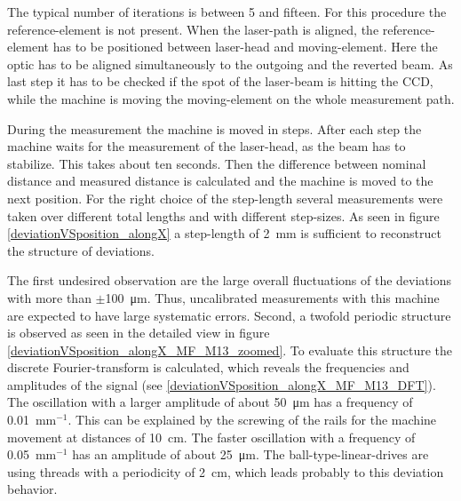 \documentclass[
twoside,            %
BCOR1.4cm,          %
10pt,               %
headings=normal,    %
headsepline,        %
clearplainpage,		%
final,              %
div=14,
open=right,
bibliography=toc
]{scrreprt}
\begin{document}
The typical number of iterations is between 5 and fifteen.
For this procedure the reference-element is not present.
When the laser-path is aligned, the reference-element has to be positioned between laser-head and moving-element.
Here the optic has to be aligned simultaneously to the outgoing and the reverted beam.
As last step it has to be checked if the spot of the laser-beam is hitting the CCD, while the machine is moving the moving-element on the whole measurement path.

During the measurement the machine is moved in steps. 
After each step the machine waits for the measurement of the laser-head, as the beam has to stabilize. 
This takes about ten seconds.
Then the difference between nominal distance and measured distance is calculated and the machine is moved to the next position.
For the right choice of the step-length several measurements were taken over different total lengths and with different step-sizes.
As seen in figure \ref{deviationVSposition_alongX} a step-length of \SI{2}{mm} is sufficient to reconstruct the structure of deviations.

The first undesired observation are the large overall fluctuations of the deviations with more than $\pm$\SI{100}{\micro m}.
Thus, uncalibrated measurements with this machine are expected to have large systematic errors.
Second, a twofold periodic structure is observed as seen in the detailed view in figure \ref{deviationVSposition_alongX_MF_M13_zoomed}.
To evaluate this structure the discrete Fourier-transform is calculated, which reveals the frequencies and amplitudes of the signal (see \ref{deviationVSposition_alongX_MF_M13_DFT}).
The oscillation with a larger amplitude of about \SI{50}{\micro m} has a frequency of \SI{0.01}{mm}$^{-1}$.
This can be explained by the screwing of the rails for the machine movement at distances of \SI{10}{cm}.
The faster oscillation with a frequency of \SI{0.05}{mm}$^{-1}$ has an amplitude of about \SI{25}{\micro m}.
The ball-type-linear-drives are using threads with a periodicity of \SI{2}{cm}, which leads probably to this deviation behavior.
\end{document}
